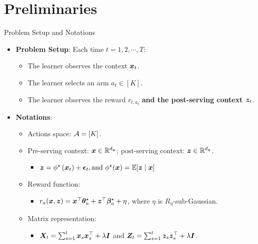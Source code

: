 \documentclass[10pt, xcolor=x11names,compress]{beamer}
\begin{document}
\section{Preliminaries}
\begin{frame}[label=Background]{Problem Setup and Notations}

\begin{itemize}
    \item \textbf{Problem Setup}: Each time $t = 1, 2, \cdots, T$:
    \begin{itemize}
        \item The learner observes the context ${\bm{x}}_t$.
        \item The learner selects an arm $a_t \in [K] $.
        \item The learner observes the reward $r_{t,a_t}$ \textbf{and the post-serving context ${\bm{z}}_t$}.
    \end{itemize}
\end{itemize}

\begin{itemize}
    \item \textbf{Notations}:
    \begin{itemize}
        \item Actions space: ${\mathcal{A}} = [K]$.
        
        \item Pre-serving context: ${\bm{x}} \in {\mathbb{R}}^{d_{{\bm{x}}}}$; post-serving context: ${\bm{z}} \in {\mathbb{R}}^{d_{{\bm{z}}}}$.
        \begin{itemize}
            \item ${\bm{z}} = \phi^{\star}\left({\bm{x}}_t\right)+{\bm{\epsilon}}_t, \text{and } \phi^{\star}({\bm{x}})={\mathbb{E}}[{\bm{z}} \mid {\bm{x}}]$
        \end{itemize}
        
        \item Reward function: 
        \begin{itemize}
            \item $r_{a}({\bm{x}}, {\bm{z}}) = {\bm{x}}^\top {\bm{\theta}}_a^\star + {\bm{z}}^\top {\bm{\beta}}_a^\star + \eta$, where $\eta$ is $R_{\eta}$-sub-Gaussian.
        \end{itemize}
        
        \item Matrix representation: 
        \begin{itemize}
            \item ${\bm{X}}_{t} = \sum_{s=1}^t {\bm{x}}_s{\bm{x}}_s^\top + \lambda {\bm{I}}$ and ${\bm{Z}}_t = \sum_{s=1}^t {\bm{z}}_s {\bm{z}}_s^\top + \lambda {\bm{I}}$.
        \end{itemize}
        

\end{itemize}
\end{itemize}
\end{frame}
\end{document}
